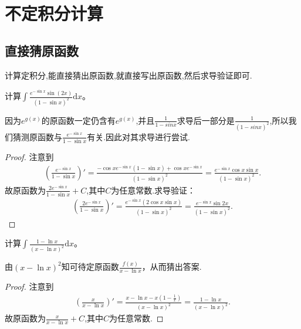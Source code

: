 \documentclass[../../main.tex]{subfiles}%
\begin{document}
\section{不定积分计算}

\subsection{直接猜原函数}

计算定积分,能直接猜出原函数,就直接写出原函数,然后求导验证即可.

\vspace{0.5cm}

\begin{example}
计算\(\int \frac{e^{-\sin x}\sin(2x)}{(1 - \sin x)^2}\mathrm{d}x\)。
\end{example}
\begin{note}
因为$e^{g(x)}$的原函数一定仍含有$e^{g(x)}$,并且$\frac{1}{1-sinx}$求导后一部分是$\frac{1}{(1-sinx)^2}$,所以我们猜测原函数与$\frac{e^{-\sin x}}{1-\sin x}$有关.因此对其求导进行尝试.
\end{note}
\begin{proof}
注意到
\begin{align*}
\left(\frac{e^{-\sin x}}{1 - \sin x}\right)' = \frac{-\cos x e^{-\sin x}(1 - \sin x)+\cos x e^{-\sin x}}{(1 - \sin x)^2}
=\frac{e^{-\sin x}\cos x\sin x}{(1 - \sin x)^2}.
\end{align*}
故原函数为\(\frac{2e^{-\sin x}}{1 - \sin x}+C\),其中$C$为任意常数.求导验证：
\begin{align*}
\left(\frac{2e^{-\sin x}}{1 - \sin x}\right)'=\frac{e^{-\sin x}(2\cos x\sin x)}{(1 - \sin x)^2}=\frac{e^{-\sin x}\sin 2x}{(1 - \sin x)^2}.
\end{align*} 
\end{proof}

\begin{example}
计算\(\int \frac{1 - \ln x}{(x - \ln x)^2}\mathrm{d}x\)。
\end{example}
\begin{note}
由\((x - \ln x)^2\)知可待定原函数\(\frac{f(x)}{x - \ln x}\)，从而猜出答案.
\end{note}
\begin{proof}
注意到
\begin{align*}
\left( \frac{x}{x-\ln x} \right) \prime =\frac{x-\ln x-x\left( 1-\frac{1}{x} \right)}{\left( x-\ln x \right) ^2}=\frac{1-\ln x}{\left( x-\ln x \right) ^2}.
\end{align*}
故原函数为$\frac{x}{x-\ln x}+C$,其中$C$为任意常数.
\end{proof}
\end{document}
